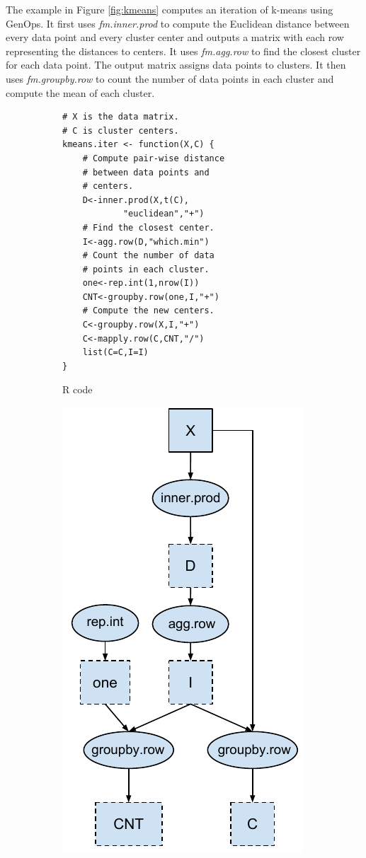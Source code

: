 The example in Figure \ref{fig:kmeans} computes an iteration of k-means
\cite{kmeans} using GenOps. It first uses \textit{fm.inner.prod} to
compute the Euclidean distance between every data point and every cluster center
and outputs a matrix with each row representing the distances to centers.  
It uses \textit{fm.agg.row} to find the closest
cluster for each data point.  The output matrix 
assigns data points to clusters. It then uses \textit{fm.groupby.row} to count
the number of data points in each cluster and compute the mean of each cluster.

\begin{figure}
\centering
	\footnotesize
	\begin{subfigure}{.25\textwidth}
	\centering
	\begin{verbatim}
# X is the data matrix.
# C is cluster centers.
kmeans.iter <- function(X,C) {
	# Compute pair-wise distance
	# between data points and
	# centers.
	D<-inner.prod(X,t(C),
			"euclidean","+")
	# Find the closest center.
	I<-agg.row(D,"which.min")
	# Count the number of data
	# points in each cluster.
	one<-rep.int(1,nrow(I))
	CNT<-groupby.row(one,I,"+")
	# Compute the new centers.
	C<-groupby.row(X,I,"+")
	C<-mapply.row(C,CNT,"/")
	list(C=C,I=I)
}
	\end{verbatim}
	\label{fig:code}
		\caption{R code }
	\hspace{20pt}
	\end{subfigure}%
	\begin{subfigure}{.25\textwidth}
	\centering
	\includegraphics[scale=0.5]{FlashMatrix_figs/DAG.pdf}

\end{subfigure}
\end{figure}
